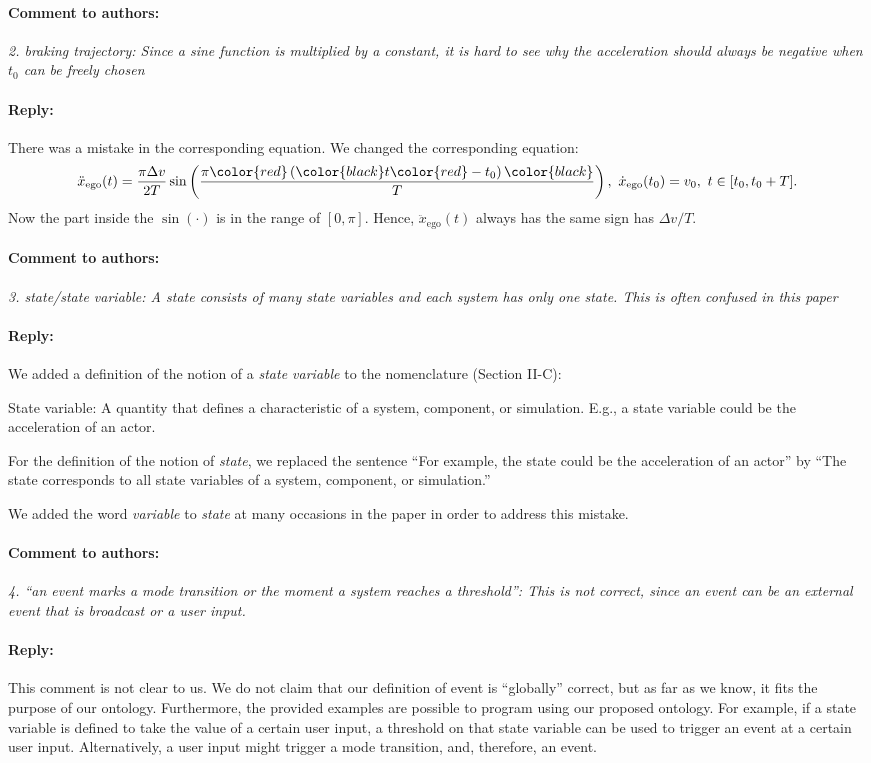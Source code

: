 \documentclass[10pt,final,a4paper,oneside,onecolumn]{article}
\newcommand{\toauthor}{\paragraph*{Comment to authors:} \itshape}
\newcommand{\fromauthor}{\paragraph*{Reply:} \normalfont}
\newcommand{\cstart}{\cbstart\color{red}}
\newcommand{\cend}{\cbend\color{black}}
\newcommand{\amplitude}{\Delta v}
\newcommand{\duration}{T}
\newcommand{\east}{x}
\newcommand{\egosub}{ego}
\newcommand{\egospeed}{\dot{\east}_{\mathrm{\egosub}}}
\newcommand{\egospeedinitsymbol}{v}
\newcommand{\egospeedinit}{\egospeedinitsymbol_{0}}
\newcommand{\egoacceleration}{\ddot{\east}_{\mathrm{\egosub}}}
\renewcommand{\time}{t}
\newcommand{\inittime}{\time_{0}}
\begin{document}
\toauthor 2. braking trajectory: Since a sine function is multiplied by a constant, it is hard to see why the acceleration should always be negative when $t_0$ can be freely chosen

\fromauthor There was a mistake in the corresponding equation. We changed the corresponding equation:
\begin{equation}
\egoacceleration(\time) = \frac{\pi \amplitude}{2\duration} \sin \left( \frac{\pi \color{red}\left(\color{black} \time \color{red} - \inittime\right)\color{black}}{\duration} \right),\ \egospeed(\inittime) = \egospeedinit,\ \time \in [\inittime, \inittime+\duration].
\end{equation}
Now the part inside the $\sin(\cdot)$ is in the range of $[0, \pi]$. Hence, $\egoacceleration(\time)$ always has the same sign has $\amplitude/\duration$.

\toauthor 3. state/state variable: A state consists of many state variables and each system has only one state. This is often confused in this paper

\fromauthor We added a definition of the notion of a \emph{state variable} to the nomenclature (Section II-C):

\cstart State variable: A quantity that defines a characteristic of a system, component, or simulation. E.g., a state variable could be the acceleration of an actor.\cend

For the definition of the notion of \emph{state}, we replaced the sentence ``For example, the state could be the acceleration of an actor'' by ``\cstart The state corresponds to all state variables of a system, component, or simulation.\cend''

We added the word \cstart \emph{variable} \cend to \emph{state} at many occasions in the paper in order to address this mistake.

\toauthor 4. ``an event marks a mode transition or the moment a system reaches a threshold'': This is not correct, since an event can be an external event that is broadcast or a user input.

\fromauthor This comment is not clear to us. We do not claim that our definition of event is ``globally'' correct, but as far as we know, it fits the purpose of our ontology. Furthermore, the provided examples are possible to program using our proposed ontology. For example, if a state variable is defined to take the value of a certain user input, a threshold on that state variable can be used to trigger an event at a certain user input. Alternatively, a user input might trigger a mode transition, and, therefore, an event.
\end{document}
